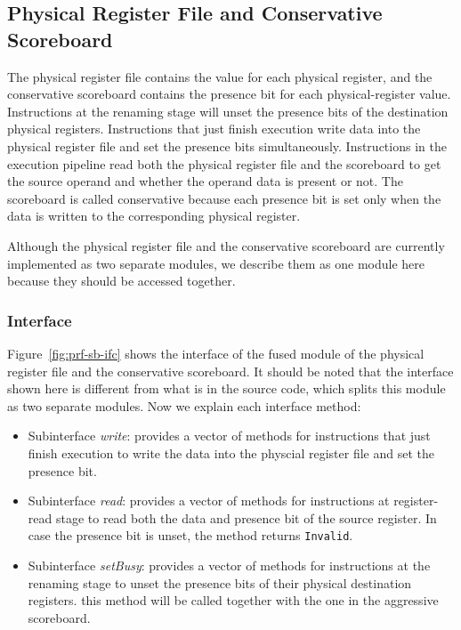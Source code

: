 \subsection{Physical Register File and Conservative Scoreboard}\label{sec:prf+sbcons}

The physical register file contains the value for each physical register, and the conservative scoreboard contains the presence bit for each physical-register value.
Instructions at the renaming stage will unset the presence bits of the destination physical registers.
Instructions that just finish execution write data into the physical register file and set the presence bits simultaneously.
Instructions in the execution pipeline read both the physical register file and the scoreboard to get the source operand and whether the operand data is present or not.
The scoreboard is called conservative because each presence bit is set only when the data is written to the corresponding physical register.

Although the physical register file and the conservative scoreboard are currently implemented as two separate modules, we describe them as one module here because they should be accessed together.

\subsubsection{Interface}
Figure~\ref{fig:prf-sb-ifc} shows the interface of the fused module of the physical register file and the conservative scoreboard.
It should be noted that the interface shown here is different from what is in the source code, which splits this module as two separate modules.
Now we explain each interface method:
\begin{itemize}
    \item Subinterface \emph{write}: provides a vector of methods for instructions that just finish execution to write the data into the physcial register file and set the presence bit.
    \item Subinterface \emph{read}: provides a vector of methods for instructions at register-read stage to read both the data and presence bit of the source register.
    In case the presence bit is unset, the method returns \texttt{Invalid}.
    \item Subinterface \emph{setBusy}: provides a vector of methods for instructions at the renaming stage to unset the presence bits of their physical destination registers.
    this method will be called together with the one in the aggressive scoreboard.
\end{itemize}

